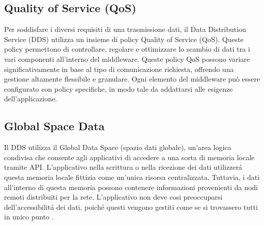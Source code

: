  
\subsection{Quality of Service (QoS)}

Per soddisfare i diversi requisiti di una trasmissione dati, 
il Data Distribution Service (DDS) utilizza un insieme di policy
Quality of Service (QoS). Queste policy permettono di controllare, 
regolare e ottimizzare lo scambio di dati tra i vari componenti 
all'interno del middleware. Queste policy QoS possono variare 
significativamente in base al tipo di comunicazione richiesta, 
offrendo una gestione altamente flessibile e granulare. 
Ogni elemento del middleware può essere configurato 
con policy specifiche, in modo tale da addattarsi alle 
esigenze dell'applicazione.

\subsection{Global Space Data}
Il DDS utilizza il Global Data 
Space (spazio dati globale), un'area logica condivisa 
che consente agli applicativi
di accedere a una sorta di memoria locale tramite API.
L'applicativo nella scrittura o nella ricezione dei dati utilizzerá 
questa memoria locale fittizia come un'unica risorsa centralizzata.
Tuttavia, i dati all'interno di questa memoria possono contenere
informazioni provenienti da nodi remoti distribuiti per la rete. 
L'applicativo non deve cosi preoccuparsi dell'accessibilitá dei dati,
poiché questi vengono gestiti come se si trovassero tutti in unico punto 
\cite{whatisdds}.


